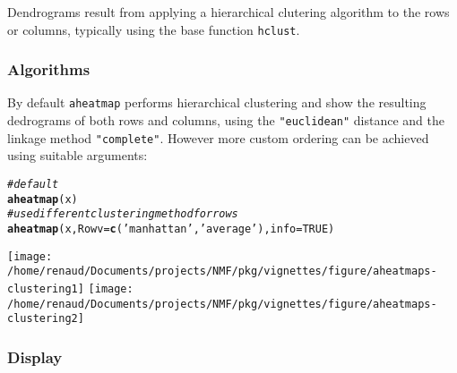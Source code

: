 \documentclass[a4paper]{article}\usepackage[]{graphicx}\usepackage[]{color}
\makeatletter
\newcommand{\hlnum}[1]{\textcolor[rgb]{0.686,0.059,0.569}{#1}}%
\newcommand{\hlstr}[1]{\textcolor[rgb]{0.192,0.494,0.8}{#1}}%
\newcommand{\hlcom}[1]{\textcolor[rgb]{0.678,0.584,0.686}{\textit{#1}}}%
\newcommand{\hlstd}[1]{\textcolor[rgb]{0.345,0.345,0.345}{#1}}%
\newcommand{\hlkwc}[1]{\textcolor[rgb]{0.333,0.667,0.333}{#1}}%
\newcommand{\hlkwd}[1]{\textcolor[rgb]{0.737,0.353,0.396}{\textbf{#1}}}%
\newenvironment{kframe}{%
 \def\at@end@of@kframe{}%
 \ifinner\ifhmode%
  \def\at@end@of@kframe{\end{minipage}}%
  \begin{minipage}{\columnwidth}%
 \fi\fi%
 \def\FrameCommand##1{\hskip\@totalleftmargin \hskip-\fboxsep
 \colorbox{shadecolor}{##1}\hskip-\fboxsep
     \hskip-\linewidth \hskip-\@totalleftmargin \hskip\columnwidth}%
 \MakeFramed {\advance\hsize-\width
   \@totalleftmargin\z@ \linewidth\hsize
   \@setminipage}}%
 {\par\unskip\endMakeFramed%
 \at@end@of@kframe}
\newenvironment{knitrout}{}{} %
\let\code=\texttt
\makeatother
\begin{document}
Dendrograms result from applying a hierarchical clutering algorithm to the rows
or columns, typically using the base function \code{hclust}.

\subsubsection{Algorithms}
By default \code{aheatmap} performs hierarchical clustering and show the
resulting dedrograms of both rows and columns, using the \code{"euclidean"}
distance and the linkage method \code{"complete"}.
However more custom ordering can be achieved using suitable
arguments:

\begin{knitrout}\small
{}\color{fgcolor}\begin{kframe}
\begin{alltt}
\hlcom{# default}
\hlkwd{aheatmap}\hlstd{(x)}
\hlcom{# use different clustering method for rows}
\hlkwd{aheatmap}\hlstd{(x,} \hlkwc{Rowv} \hlstd{=} \hlkwd{c}\hlstd{(}\hlstr{'manhattan'}\hlstd{,} \hlstr{'average'}\hlstd{),} \hlkwc{info} \hlstd{=} \hlnum{TRUE}\hlstd{)}
\end{alltt}
\end{kframe}
\texttt{[image: /home/renaud/Documents/projects/NMF/pkg/vignettes/figure/aheatmaps-clustering1]} 
\texttt{[image: /home/renaud/Documents/projects/NMF/pkg/vignettes/figure/aheatmaps-clustering2]} 

\end{knitrout}

\subsubsection{Display}
\end{document}
